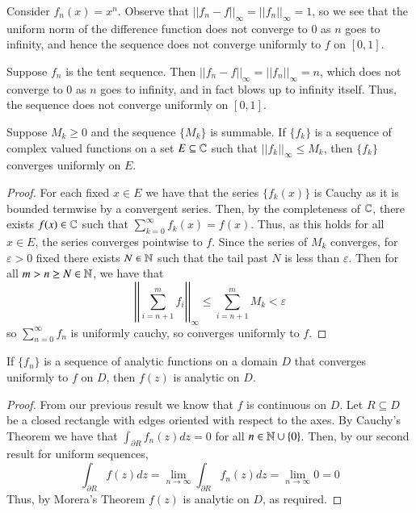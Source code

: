 \begin{example}
    Consider $f_n(x) = x^n$. Observe that $||f_n - f||_{\infty} = ||f_n||_{\infty} = 1$, so we see that the uniform norm of the difference function does not converge to $0$ as $n$ goes to infinity, and hence the sequence does not converge uniformly to $f$ on $[0,1]$.
\end{example}

\begin{example}
    Suppose $f_n$ is the tent sequence. Then $||f_n - f||_{\infty} = ||f_n||_{\infty} = n$, which does not converge to $0$ as $n$ goes to infinity, and in fact blows up to infinity itself. Thus, the sequence does not converge uniformly on $[0,1]$.
\end{example}



\begin{theorem}
    Suppose $M_k \geq 0$ and the sequence $\{M_k\}$ is summable. If $\{f_k\}$ is a sequence of complex valued functions on a set $E \subseteq \mathbb C$ such that $||f_k||_{\infty} \leq M_k$, then $\{f_k\}$ converges uniformly on $E$.
\end{theorem}
\begin{proof}
    For each fixed $x \in E$ we have that the series $\{f_k(x)\}$ is Cauchy as it is bounded termwise by a convergent series. Then, by the completeness of $\mathbb C$, there exists $f(x) \in \mathbb C$ such that $\sum_{k=0}^{\infty}f_k(x) = f(x)$. Thus, as this holds for all $x \in E$, the series converges pointwise to $f$. Since the series of $M_k$ converges, for $\varepsilon > 0$ fixed there exists $N \in \mathbb N$ such that the tail past $N$ is less than $\varepsilon$. Then for all $m > n \geq N \in \mathbb N$, we have that \begin{equation*}
        \left|\left|\sum_{i=n+1}^mf_i\right|\right|_{\infty} \leq \sum_{i=n+1}^mM_k < \varepsilon
    \end{equation*}
    so $\sum_{n=0}^{\infty}f_n$ is uniformly cauchy, so converges uniformly to $f$.
\end{proof}


\begin{theorem}
    If $\{f_n\}$ is a sequence of analytic functions on a domain $D$ that converges uniformly to $f$ on $D$, then $f(z)$ is analytic on $D$.
\end{theorem}
\begin{proof}
    From our previous result we know that $f$ is continuous on $D$. Let $R \subseteq D$ be a closed rectangle with edges oriented with respect to the axes. By Cauchy's Theorem we have that $\int_{\partial R}f_n(z)dz = 0$ for all $n \in \mathbb N\cup \{0\}$. Then, by our second result for uniform sequences, \begin{equation*}
        \int_{\partial R}f(z)dz = \lim\limits_{n\rightarrow \infty}\int_{\partial R}f_n(z)dz = \lim\limits_{n\rightarrow \infty}0 = 0
    \end{equation*}
    Thus, by Morera's Theorem $f(z)$ is analytic on $D$, as required.
\end{proof}


